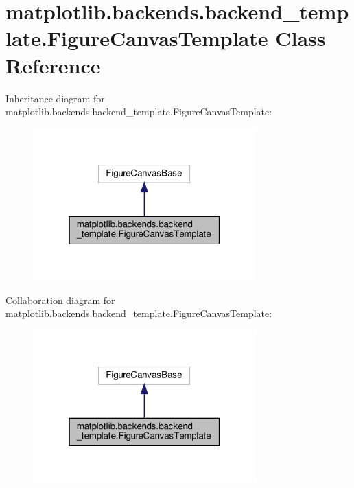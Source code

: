 \hypertarget{classmatplotlib_1_1backends_1_1backend__template_1_1FigureCanvasTemplate}{}\section{matplotlib.\+backends.\+backend\+\_\+template.\+Figure\+Canvas\+Template Class Reference}
\label{classmatplotlib_1_1backends_1_1backend__template_1_1FigureCanvasTemplate}


Inheritance diagram for matplotlib.\+backends.\+backend\+\_\+template.\+Figure\+Canvas\+Template\+:
\nopagebreak
\begin{figure}[H]
\begin{center}
\leavevmode
\includegraphics[width=244pt]{classmatplotlib_1_1backends_1_1backend__template_1_1FigureCanvasTemplate__inherit__graph}
\end{center}
\end{figure}


Collaboration diagram for matplotlib.\+backends.\+backend\+\_\+template.\+Figure\+Canvas\+Template\+:
\nopagebreak
\begin{figure}[H]
\begin{center}
\leavevmode
\includegraphics[width=244pt]{classmatplotlib_1_1backends_1_1backend__template_1_1FigureCanvasTemplate__coll__graph}
\end{center}
\end{figure}
